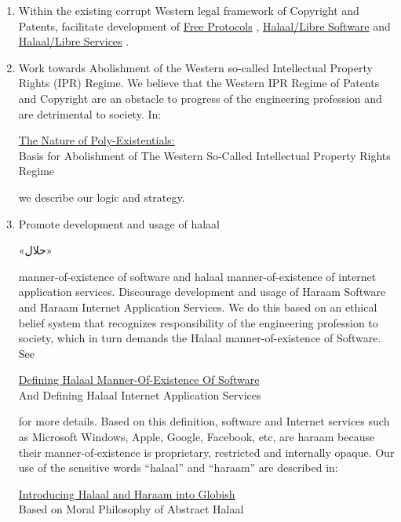 \begin{enumerate}
  \item 
Within the existing corrupt Western legal framework of Copyright and Patents,
facilitate development of 
\href{http://www.freeprotocols.org/}{Free Protocols}
,
\href{http://www.fsf.org/}{Halaal/Libre Software}
and 
\href{http://www.libreservices.org/}{Halaal/Libre Services}
.
\item Work towards Abolishment of the Western so-called Intellectual Property Rights (IPR)
  Regime.  We believe that the Western IPR Regime of Patents and Copyright are an obstacle
  to progress of the engineering profession and are detrimental to society.  In:
\begin{center}
\href{http://www.persoarabic.org/PLPC/120033}{The Nature of Poly-Existentials:}\\
Basis for Abolishment of The Western So-Called Intellectual Property Rights Regime\\
\end{center}
we describe our logic and strategy.
\item Promote development and usage of halaal \begin{fa}«حلال»\end{fa} manner-of-existence
  of software and halaal manner-of-existence of internet application services.  Discourage
  development and usage of Haraam Software and Haraam Internet Application Services.  We
  do this based on an ethical belief system that recognizes responsibility of the
  engineering profession to society, which in turn demands the Halaal manner-of-existence
  of Software. See
\begin{center}
\href{http://www.persoarabic.org/PLPC/120041}{Defining Halaal Manner-Of-Existence Of Software}\\
And Defining Halaal Internet Application Services\\
\end{center}
for more details. Based on this definition, software and Internet
services such as Microsoft Windows, Apple, Google, Facebook, etc, are
haraam because their manner-of-existence is proprietary, restricted
and internally opaque. 
Our use of the sensitive words ``halaal'' and
``haraam'' are described in:
\begin{center}
\href{http://www.persoarabic.org/PLPC/120041}{Introducing Halaal and Haraam into Globish}\\
Based on Moral Philosophy of Abstract Halaal\\
\end{center}
\end{enumerate}

